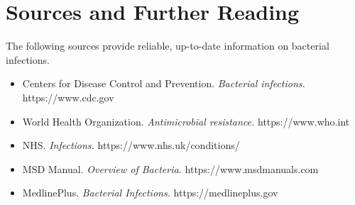 \section*{Sources and Further Reading}
The following sources provide reliable, up-to-date information on bacterial infections.
\begin{itemize}
    \item Centers for Disease Control and Prevention. \textit{Bacterial infections.} https://www.cdc.gov
    \item World Health Organization. \textit{Antimicrobial resistance.} https://www.who.int
    \item NHS. \textit{Infections.} https://www.nhs.uk/conditions/
    \item MSD Manual. \textit{Overview of Bacteria.} https://www.msdmanuals.com
    \item MedlinePlus. \textit{Bacterial Infections.} https://medlineplus.gov
\end{itemize}
